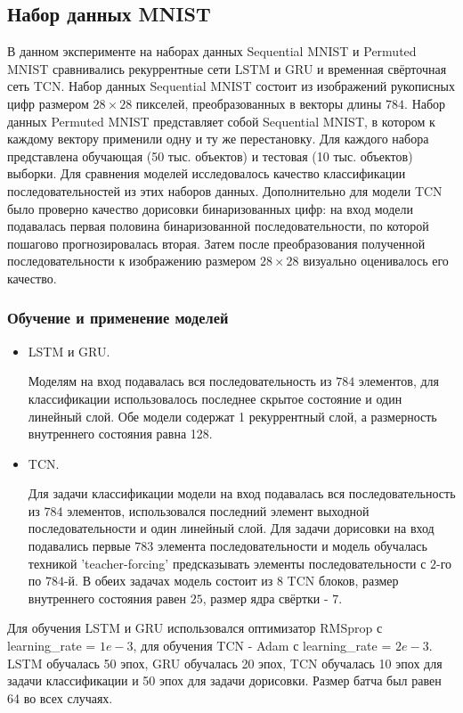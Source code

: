 \documentclass{article}
\begin{document}
\subsection{Набор данных MNIST}
В данном эксперименте на наборах данных Sequential MNIST и Permuted MNIST сравнивались рекуррентные сети LSTM и GRU и временная свёрточная сеть TCN. Набор данных Sequential MNIST состоит из изображений рукописных цифр размером $28 \times 28$ пикселей, преобразованных в векторы длины $784$. Набор данных Permuted MNIST представляет собой Sequential MNIST, в котором к каждому вектору применили одну и ту же перестановку. Для каждого набора представлена обучающая (50 тыс. объектов) и тестовая (10 тыс. объектов) выборки.  Для сравнения моделей исследовалось качество классификации последовательностей из этих наборов данных. Дополнительно для модели TCN было проверно качество дорисовки бинаризованных цифр: на вход модели подавалась первая половина бинаризованной последовательности, по которой пошагово прогнозировалась вторая. Затем после преобразования полученной последовательности к изображению размером $28 \times 28$ визуально оценивалось его качество. 

\subsubsection{Обучение и применение моделей}

\begin{itemize}
\item LSTM и GRU.

Моделям на вход подавалась вся последовательность из $784$ элементов, для классификации использовалось последнее скрытое состояние и один линейный слой. Обе модели содержат 1 рекуррентный слой, а размерность внутреннего состояния равна 128. 

\item TCN.

Для задачи классификации модели на вход подавалась вся последовательность из $784$ элементов, использовался последний элемент выходной последовательности и один линейный слой. Для задачи дорисовки на вход подавались первые $783$ элемента последовательности и модель обучалась техникой 'teacher-forcing' предсказывать элементы последовательности с $2$-го по $784$-й. В обеих задачах модель состоит из $8$ TCN блоков, размер внутреннего состояния равен $25$, размер ядра свёртки - $7$.
\end{itemize}

Для обучения LSTM и GRU использовался оптимизатор RMSprop с learning\_rate = $1e-3$, для обучения TCN - Adam с learning\_rate = $2e-3$. LSTM обучалась 50 эпох, GRU обучалась 20 эпох, TCN обучалась 10 эпох для задачи классификации и 50 эпох для задачи дорисовки. Размер батча был равен 64 во всех случаях. 
\end{document}
